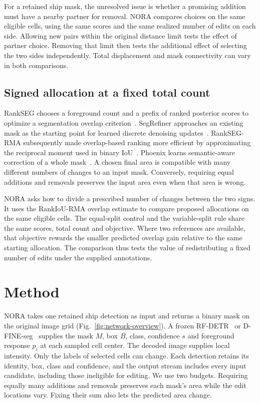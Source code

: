 \documentclass[journal]{IEEEtran}
\begin{document}
For a retained ship mask, the unresolved issue is whether a promising addition must have a nearby partner for removal. NORA compares choices on the same eligible cells, using the same scores and the same realized number of edits on each side. Allowing new pairs within the original distance limit tests the effect of partner choice. Removing that limit then tests the additional effect of selecting the two sides independently. Total displacement and mask connectivity can vary in both comparisons.

\subsection{Signed allocation at a fixed total count}
RankSEG chooses a foreground count and a prefix of ranked posterior scores to optimize a segmentation overlap criterion~\cite{rankseg}. SegRefiner approaches an existing mask as the starting point for learned discrete denoising updates~\cite{segrefiner}. RankSEG-RMA subsequently made overlap-based ranking more efficient by approximating the reciprocal moment used in binary IoU~\cite{rankrma}. Phoenix learns semantic-aware correction of a whole mask~\cite{phoenix}. A chosen final area is compatible with many different numbers of changes to an input mask. Conversely, requiring equal additions and removals preserves the input area even when that area is wrong.

NORA asks how to divide a prescribed number of changes between the two signs. It uses the RankIoU-RMA overlap estimate to compare proposed allocations on the same eligible cells. The equal-split control and the variable-split rule share the same scores, total count and objective. Where two references are available, that objective rewards the smaller predicted overlap gain relative to the same starting allocation. The comparison thus tests the value of redistributing a fixed number of edits under the supplied annotations.

\section{Method}
\label{sec:method}

NORA takes one retained ship detection as input and returns a binary mask on the original image grid (Fig.~\ref{fig:network-overview}). A frozen RF-DETR~\cite{rfdetr} or D-FINE-seg~\cite{dfine} supplies the mask \(M\), box \(B\), class, confidence \(s\) and foreground response \(p_i\) at each sampled cell center. The decoded image supplies local intensity. Only the labels of selected cells can change. Each detection retains its identity, box, class and confidence, and the output stream includes every input candidate, including those ineligible for editing. We use two budgets. Requiring equally many additions and removals preserves each mask's area while the edit locations vary. Fixing their sum also lets the predicted area change.
\end{document}
